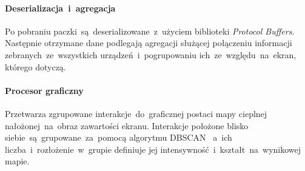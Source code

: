 \paragraph{Deserializacja~i~agregacja}
Po pobraniu paczki~są~deserializowane~z~użyciem biblioteki {\it Protocol Buffers}. Następnie otrzymane dane podlegają agregacji służącej połączeniu informacji zebranych~ze~wszystkich urządzeń~i~pogrupowaniu ich~ze~względu~na~ekran, którego dotyczą.

\paragraph{Procesor graficzny} 
\label{par:rs_graphical_processor}
Przetwarza zgrupowane interakcje~do~graficznej postaci mapy cieplnej nałożonej~na~obraz zawartości ekranu. Interakcje położone blisko siebie~są~grupowane~za~pomocą algorytmu DBSCAN \cite{DBSCAN_Wiki}~a~ich liczba~i~rozłożenie~w~grupie definiuje jej intensywność~i~kształt~na~wynikowej mapie.

